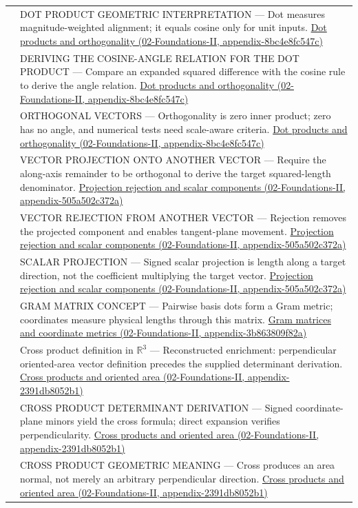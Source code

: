 {\begin{longtable}[]{@{}
  >{\raggedright\arraybackslash}p{}
  >{\raggedright\arraybackslash}p{}@{}}
535 & DOT PRODUCT GEOMETRIC INTERPRETATION --- Dot measures magnitude-weighted alignment; it equals cosine only for unit inputs. \href{}{Dot products and orthogonality (02-Foundations-II, appendix-8bc4e8fc547c)} \\
536 & DERIVING THE COSINE-ANGLE RELATION FOR THE DOT PRODUCT --- Compare an expanded squared difference with the cosine rule to derive the angle relation. \href{}{Dot products and orthogonality (02-Foundations-II, appendix-8bc4e8fc547c)} \\
537 & ORTHOGONAL VECTORS --- Orthogonality is zero inner product; zero has no angle, and numerical tests need scale-aware criteria. \href{}{Dot products and orthogonality (02-Foundations-II, appendix-8bc4e8fc547c)} \\
538 & VECTOR PROJECTION ONTO ANOTHER VECTOR --- Require the along-axis remainder to be orthogonal to derive the target squared-length denominator. \href{}{Projection rejection and scalar components (02-Foundations-II, appendix-505a502c372a)} \\
539 & VECTOR REJECTION FROM ANOTHER VECTOR --- Rejection removes the projected component and enables tangent-plane movement. \href{}{Projection rejection and scalar components (02-Foundations-II, appendix-505a502c372a)} \\
540 & SCALAR PROJECTION --- Signed scalar projection is length along a target direction, not the coefficient multiplying the target vector. \href{}{Projection rejection and scalar components (02-Foundations-II, appendix-505a502c372a)} \\
541 & GRAM MATRIX CONCEPT --- Pairwise basis dots form a Gram metric; coordinates measure physical lengths through this matrix. \href{}{Gram matrices and coordinate metrics (02-Foundations-II, appendix-3b863809f82a)} \\
542 & Cross product definition in \(\mathbb R^3\) --- Reconstructed enrichment: perpendicular oriented-area vector definition precedes the supplied determinant derivation. \href{}{Cross products and oriented area (02-Foundations-II, appendix-2391db8052b1)} \\
543 & CROSS PRODUCT DETERMINANT DERIVATION --- Signed coordinate-plane minors yield the cross formula; direct expansion verifies perpendicularity. \href{}{Cross products and oriented area (02-Foundations-II, appendix-2391db8052b1)} \\
544 & CROSS PRODUCT GEOMETRIC MEANING --- Cross produces an area normal, not merely an arbitrary perpendicular direction. \href{}{Cross products and oriented area (02-Foundations-II, appendix-2391db8052b1)} \\

\end{longtable}}
